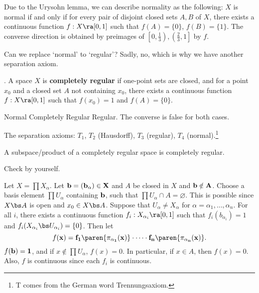 \rmk Due to the Urysohn lemma, we can describe normality as the following: \(X\) is normal if and only if for every pair of disjoint closed sets \(A, B\) of \(X\), there exists a continuous function \(f : X \ra [0, 1]\) such that \(f(A) = \{0\}\), \(f(B) = \{1\}\). The converse direction is obtained by preimages of \(\left[0, \frac{1}{3}\right), \left(\frac{2}{3}, 1\right]\) by \(f\).

Can we replace `normal' to `regular'? Sadly, no, which is why we have another separation axiom.

.  A space \(X\) is \textbf{completely regular} if one-point sets are closed, and for a point \(x_0\) and a closed set \(A\) not containing \(x_0\), there exists a continuous function \(f: X \ra [0, 1]\) such that \(f(x_0) = 1\) and \(f(A) = \{0\}\).

\rmk Normal \mimp Completely Regular \mimp Regular. The converse is false for both cases.

\rmk The separation axioms: \(T_1\), \(T_2\) (Hausdorff), \(T_3\) (regular), \(T_4\) (normal).\footnote{T comes from the German word Trennungsaxiom.}

 A subspace/product of a completely regular space is completely regular.

\pf {} Check by yourself.

 Let \(X = \prod X_\alpha\). Let \(\bf{b} = (b_\alpha) \in X\) and \(A\) be closed in \(X\) and \(\bf{b} \notin A\). Choose a basis element \(\prod U_\alpha\) containing \(\bf{b}\), such that \(\prod U_\alpha \cap A = \varnothing\). This is possible since \(X \bs A\) is open and \(x_0 \in X \bs A\). Suppose that \(U_\alpha \neq X_\alpha\) for \(\alpha = \alpha_1, \dots, \alpha_n\). For all \(i\), there exists a continuous function \(f_i: X_{\alpha_i} \ra [0, 1]\) such that \(f_i(b_{\alpha_i}) = 1\) and \(f_i(X_{\alpha_i} \bs U_{\alpha_i}) = \{0\}\). Then let
\[
    f(\bf{x}) = f_1 \paren{\pi_{\alpha_1} (\bf{x})} \cdot \cdots \cdot f_n \paren{\pi_{\alpha_n} (\bf{x})}.
\]
\(f(\bf{b}) = 1\), and if \(x \notin \prod U_\alpha\), \(f(x) = 0\). In particular, if \(x \in A\), then \(f(x) = 0\). Also, \(f\) is continuous since each \(f_i\) is continuous.

\pagebreak
